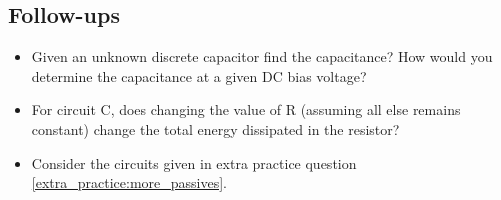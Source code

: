 \documentclass[main.tex]{subfiles}
\begin{document}
\subsection{Follow-ups}
\begin{itemize}
    \item Given an unknown discrete capacitor find the capacitance? How would you determine the capacitance at a given DC bias voltage? %
    \item For circuit C, does changing the value of R (assuming all else remains constant) change the total energy dissipated in the resistor? %
    \item Consider the circuits given in extra practice question \ref{extra_practice:more_passives}. %
\end{itemize}
\end{document}
